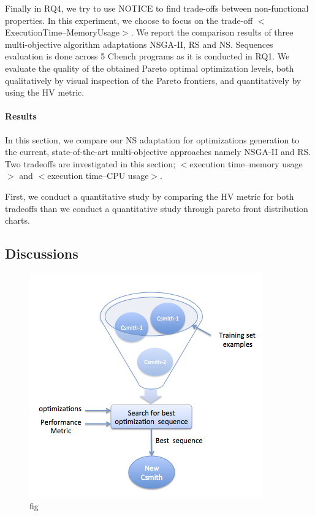 Finally in RQ4, we try to use NOTICE to find trade-offs between non-functional properties. In this experiment, we choose to focus on the trade-off $<$ExecutionTime--MemoryUsage$>$. We report the comparison results of three multi-objective algorithm adaptations NSGA-II, RS and NS. 
Sequences evaluation is done across 5 Cbench programs as it is conducted in RQ1.
We evaluate the quality of the obtained Pareto optimal optimization levels, both qualitatively by visual inspection of the Pareto frontiers, and quantitatively by using the HV metric.
\paragraph{Results}
In this section, we compare our NS adaptation for optimizations generation to the current, state-of-the-art multi-objective approaches namely NSGA-II and RS. Two tradeoffs are investigated in this section; $<$execution time--memory usage$>$ and $<$execution time--CPU usage$>$.

First, we conduct a quantitative study by comparing the HV metric for both tradeoffs than we conduct a quantitative study through pareto front distribution charts.
\subsection{Discussions}










\begin{figure}[!t]
	\centering
	\includegraphics[width=1\hsize]{Ressources/approach by example.png}
	\caption{fig}
\end{figure}

